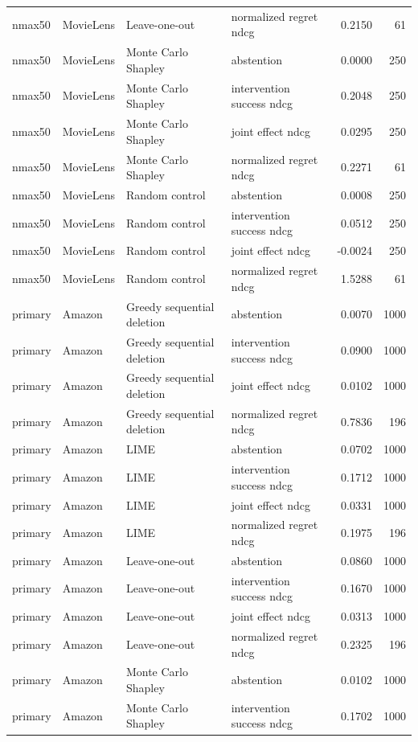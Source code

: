\begin{longtable}{@{}p{.16\linewidth}p{.11\linewidth}p{.15\linewidth}p{.22\linewidth}rr@{}}
nmax50 & MovieLens & Leave-one-out & normalized regret ndcg & 0.2150 & 61 \\
nmax50 & MovieLens & Monte Carlo Shapley & abstention & 0.0000 & 250 \\
nmax50 & MovieLens & Monte Carlo Shapley & intervention success ndcg & 0.2048 & 250 \\
nmax50 & MovieLens & Monte Carlo Shapley & joint effect ndcg & 0.0295 & 250 \\
nmax50 & MovieLens & Monte Carlo Shapley & normalized regret ndcg & 0.2271 & 61 \\
nmax50 & MovieLens & Random control & abstention & 0.0008 & 250 \\
nmax50 & MovieLens & Random control & intervention success ndcg & 0.0512 & 250 \\
nmax50 & MovieLens & Random control & joint effect ndcg & -0.0024 & 250 \\
nmax50 & MovieLens & Random control & normalized regret ndcg & 1.5288 & 61 \\
primary & Amazon & Greedy sequential deletion & abstention & 0.0070 & 1000 \\
primary & Amazon & Greedy sequential deletion & intervention success ndcg & 0.0900 & 1000 \\
primary & Amazon & Greedy sequential deletion & joint effect ndcg & 0.0102 & 1000 \\
primary & Amazon & Greedy sequential deletion & normalized regret ndcg & 0.7836 & 196 \\
primary & Amazon & LIME & abstention & 0.0702 & 1000 \\
primary & Amazon & LIME & intervention success ndcg & 0.1712 & 1000 \\
primary & Amazon & LIME & joint effect ndcg & 0.0331 & 1000 \\
primary & Amazon & LIME & normalized regret ndcg & 0.1975 & 196 \\
primary & Amazon & Leave-one-out & abstention & 0.0860 & 1000 \\
primary & Amazon & Leave-one-out & intervention success ndcg & 0.1670 & 1000 \\
primary & Amazon & Leave-one-out & joint effect ndcg & 0.0313 & 1000 \\
primary & Amazon & Leave-one-out & normalized regret ndcg & 0.2325 & 196 \\
primary & Amazon & Monte Carlo Shapley & abstention & 0.0102 & 1000 \\
primary & Amazon & Monte Carlo Shapley & intervention success ndcg & 0.1702 & 1000 \\

\end{longtable}

